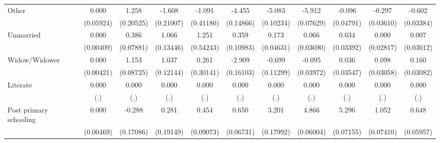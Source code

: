 {\begin{tabular}{l*{10}{c}}
Other               &       0.000         &       1.258\sym{***}&      -1.608\sym{***}&      -1.091\sym{**} &      -4.455\sym{***}&      -5.083\sym{***}&      -5.912\sym{***}&      -0.096\sym{*}  &      -0.297\sym{***}&      -0.602\sym{***}\\
                    &   (0.05924)         &   (0.20525)         &   (0.21007)         &   (0.41180)         &   (0.14866)         &   (0.10234)         &   (0.07629)         &   (0.04791)         &   (0.03610)         &   (0.03384)         \\
Unmarried           &       0.000         &       0.386\sym{***}&       1.066\sym{***}&       1.251\sym{*}  &       0.359\sym{**} &       0.173\sym{***}&       0.066         &       0.034         &       0.000         &       0.007         \\
                    &   (0.00409)         &   (0.07881)         &   (0.13446)         &   (0.54243)         &   (0.10983)         &   (0.04631)         &   (0.03690)         &   (0.03392)         &   (0.02817)         &   (0.03012)         \\
Widow/Widower       &       0.000         &       1.153\sym{***}&       1.037\sym{***}&       0.261         &      -2.909\sym{***}&      -0.699\sym{***}&      -0.095\sym{*}  &       0.036         &       0.098\sym{**} &       0.160\sym{***}\\
                    &   (0.00421)         &   (0.08725)         &   (0.12144)         &   (0.30141)         &   (0.16103)         &   (0.11299)         &   (0.03972)         &   (0.03547)         &   (0.03058)         &   (0.03082)         \\
Literate            &       0.000         &       0.000         &       0.000         &       0.000         &       0.000         &       0.000         &       0.000         &       0.000         &       0.000         &       0.000         \\
                    &         (.)         &         (.)         &         (.)         &         (.)         &         (.)         &         (.)         &         (.)         &         (.)         &         (.)         &         (.)         \\
Post primary schooling&       0.000         &      -0.288         &       0.281         &       0.454\sym{***}&       0.650\sym{***}&       3.201\sym{***}&       4.866\sym{***}&       5.296\sym{***}&       1.052\sym{***}&       0.648\sym{***}\\
                    &   (0.00469)         &   (0.17086)         &   (0.19149)         &   (0.09073)         &   (0.06731)         &   (0.17992)         &   (0.06004)         &   (0.07155)         &   (0.07410)         &   (0.05957)         \\

\end{tabular}}
